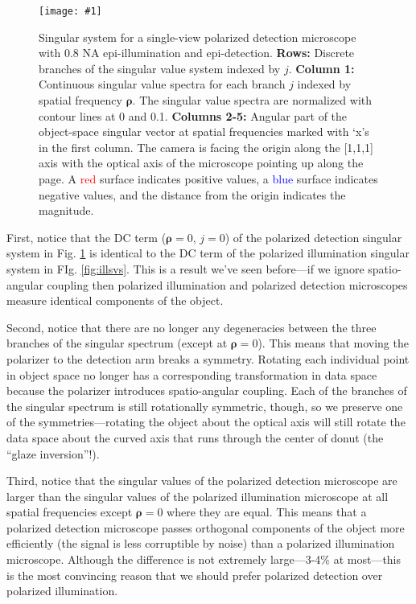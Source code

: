 \documentclass[11pt]{article}
\providecommand{\bs}[1]{\boldsymbol{#1}}
\providecommand{\fig}[4]{
\begin{figure}[h]
 \captionsetup{width=1.0\linewidth}
 \centering
 \texttt{[image: \#1]}
 \caption{#3}
 \label{fig:#4}
\end{figure}
}
\begin{document}
\fig{../calculations/out/SVSdet.pdf}{1.0}{Singular system for a single-view
  polarized detection microscope with 0.8 NA epi-illumination and
  epi-detection. \textbf{Rows:} Discrete branches of the singular value system
  indexed by $j$. \textbf{Column 1:} Continuous singular value spectra for each
  branch $j$ indexed by spatial frequency $\bs{\rho}$. The singular value
  spectra are normalized with contour lines at 0 and 0.1. \textbf{Columns 2-5:}
  Angular part of the object-space singular vector at spatial frequencies marked
  with `x's in the first column. The camera is facing the origin along the
  [1,1,1] axis with the optical axis of the microscope pointing up along the
  page. A \textcolor{red}{red} surface indicates positive values, a
  \textcolor{blue}{blue} surface indicates negative values, and the distance
  from the origin indicates the magnitude.}{detsvs}

First, notice that the DC term ($\bs{\rho} = 0$, $j=0$) of the polarized
detection singular system in Fig. \ref{fig:detsvs} is identical to the DC term
of the polarized illumination singular system in FIg. \ref{fig:illsvs}. This is
a result we've seen before---if we ignore spatio-angular coupling then polarized
illumination and polarized detection microscopes measure identical components of
the object.

Second, notice that there are no longer any degeneracies between the three
branches of the singular spectrum (except at $\bs{\rho} = 0$). This means that
moving the polarizer to the detection arm breaks a symmetry. Rotating each
individual point in object space no longer has a corresponding transformation in
data space because the polarizer introduces spatio-angular coupling. Each of the
branches of the singular spectrum is still rotationally symmetric, though, so we
preserve one of the symmetries---rotating the object about the optical axis will
still rotate the data space about the curved axis that runs through the center
of donut (the ``glaze inversion''!).

Third, notice that the singular values of the polarized detection microscope are
larger than the singular values of the polarized illumination microscope at all
spatial frequencies except $\bs{\rho} = 0$ where they are equal. This means that
a polarized detection microscope passes orthogonal components of the object more
efficiently (the signal is less corruptible by noise) than a polarized
illumination microscope. Although the difference is not extremely large---3-4\%
at most---this is the most convincing reason that we should prefer polarized
detection over polarized illumination. 
\end{document}
